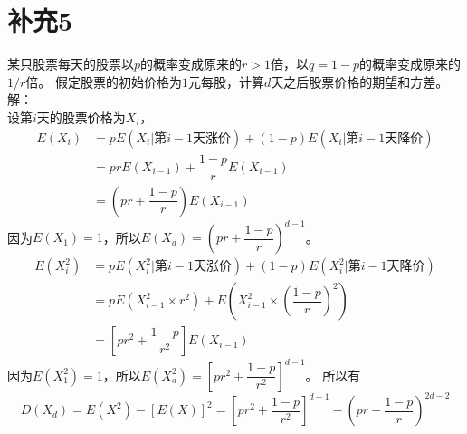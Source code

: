 \documentclass[a4papers]{ctexart}
\begin{document}
\section{补充5}
某只股票每天的股票以$p$的概率变成原来的$r>1$倍，以$q=1-p$的概率变成原来的$1/r$倍。
假定股票的初始价格为$1$元每股，计算$d$天之后股票价格的期望和方差。\\
解：\\
\indent 设第$i$天的股票价格为$X_i$，
\begin{align*}
    E(X_i)&=pE(X_i|第i-1天涨价)+(1-p)E(X_i|第i-1天降价)\\
    &=prE(X_{i-1})+\dfrac{1-p}{r}E(X_{i-1})\\
    &=\left(pr+\dfrac{1-p}{r}\right)E(X_{i-1})
\end{align*}
\indent 因为$E(X_1)=1$，所以$E(X_d)=(pr+\dfrac{1-p}{r})^{d-1}$。
\begin{align*}
    E(X_i^2)&=pE(X_i^2|第i-1天涨价)+(1-p)E(X_i^2|第i-1天降价)\\
    &=pE(X_{i-1}^2\times r^2)+E\left(X_{i-1}^2\times(\dfrac{1-p}{r})^2\right)\\
    &=\left[p r^2+\dfrac{1-p}{r^2}\right]E(X_{i-1})
\end{align*}
\indent 因为$E(X_1^2)=1$，所以$E(X_d^2)=\left[p r^2+\dfrac{1-p}{r^2}\right]^{d-1}$。
所以有
\[
    D(X_d)=E(X^2)-[E(X)]^2
    =\left[p r^2+\dfrac{1-p}{r^2}\right]^{d-1}-\left(pr+\dfrac{1-p}{r}\right)^{2d-2}
    \]
\end{document}
